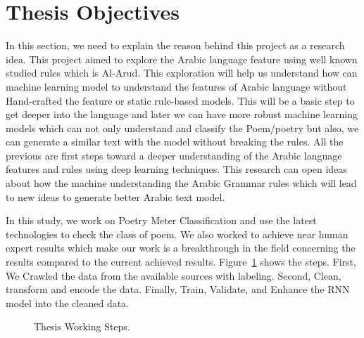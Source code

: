 \section{Thesis Objectives}
In this section, we need to explain the reason behind this project as a research idea. This project aimed to explore the Arabic language feature using well known studied rules which is Al-Arud. This exploration will help us understand how can machine learning model to understand the features of Arabic language without Hand-crafted the feature or static rule-based models. This will be a basic step to get deeper into the language and later we can have more robust machine learning models which can not only understand and classify the Poem/poetry but also, we can generate a similar text with the model without breaking the rules. All the previous are first steps toward a deeper understanding of the Arabic language features and rules using deep learning techniques. This research can open ideas about how the machine understanding the Arabic Grammar rules which will lead to new ideas to generate better Arabic text model.

In this study, we work on Poetry Meter Classification and use the latest technologies to check the class of poem. We also worked to achieve near human expert results which make our work is a breakthrough in the field concerning the results compared to the current achieved results. Figure~\ref{Fig:Thesis_Cycle} shows the steps. First, We Crawled the data from the available sources with labeling. Second, Clean, transform and encode the data. Finally, Train, Validate, and Enhance the RNN model into the cleaned data.

\begin{figure}[!t]
   
  \caption{Thesis Working Steps.}
  \label{Fig:Thesis_Cycle}
\end{figure}


\clearpage


%	
%	
%	



